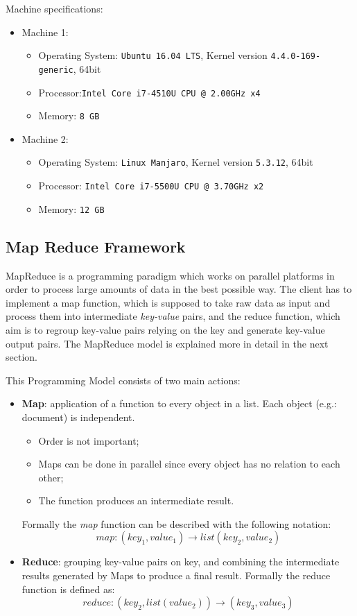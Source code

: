 \documentclass[a4paper,11pt, twoside]{article}
\begin{document}
		\noindent
		Machine specifications:
		\begin{itemize}
			\item Machine 1:\begin{itemize}
			\item Operating System: \texttt{Ubuntu 16.04 LTS}, Kernel version \texttt{4.4.0-169-generic}, 64bit
			\item Processor:\texttt{Intel Core\texttrademark\ i7-4510U CPU @ 2.00GHz x4}
			\item Memory: \texttt{8 GB}
		\end{itemize} 
			\item Machine 2: \begin{itemize}
				\item Operating System: \texttt{Linux Manjaro}, Kernel version \texttt{5.3.12}, 64bit
				\item Processor:  \texttt{Intel Core\texttrademark\ i7-5500U CPU @ 3.70GHz x2}
				\item Memory: \texttt{12 GB}
			\end{itemize}
		\end{itemize}
		

		

	\subsection{Map Reduce Framework}
		MapReduce is a programming paradigm which works on parallel platforms in order to process large amounts of data in the best possible way. The client has to implement a map function, which is supposed to take raw data as input and process them into intermediate \textit{key-value} pairs, and the reduce function, which aim is to regroup key-value pairs relying on the key and generate key-value output pairs. The MapReduce model is explained more in detail in the next section.
		
		\bigskip

		\noindent
		This Programming Model consists of two main actions:
		\begin{itemize}
			\item \textbf{Map}: application of a function to every object in a list. Each object (e.g.: document) is independent.
			\begin{itemize}
				\item Order is not important;
				\item Maps can be done in parallel since every object has no relation to each other;
				\item The function produces an intermediate result.
			\end{itemize}
			Formally the \textit{map} function can be described with the following notation: \[ map:(key_1, value_1) \to list(key_2, value_2) \]
			\item \textbf{Reduce}: grouping key-value pairs on key, and combining the intermediate results generated by Maps to produce a final result. Formally the reduce function is defined as: 
			\[
				reduce:(key_2, list(value_2)) \to (key_3, value_3)  
			\]
		\end{itemize}
\end{document}
